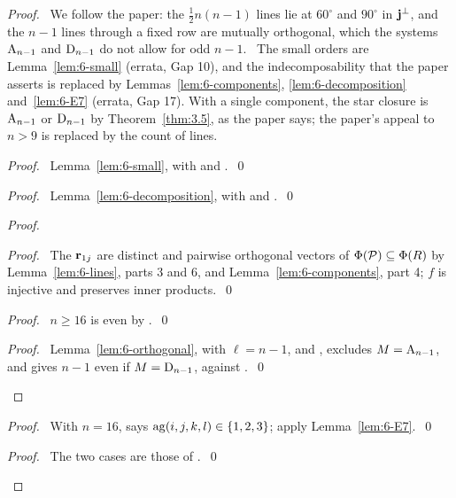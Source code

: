\begin{proof}
 \pfsketch\ We follow the paper: the $\frac12n(n-1)$ lines lie at $60^\circ$ and $90^\circ$ in
 ${\mathbf j}^\perp$, and the $n-1$ lines through a fixed row are mutually orthogonal, which the systems
 $\mathrm{A}_{n-1}$ and $\mathrm{D}_{n-1}$ do not allow for odd $n-1$. \repair\ The small orders are
 Lemma~\ref{lem:6-small} (errata, Gap 10), and the indecomposability that the paper asserts is
 replaced by Lemmas~\ref{lem:6-components}, \ref{lem:6-decomposition} and~\ref{lem:6-E7}
 (errata, Gap 17). With a single component, the star closure is $\mathrm{A}_{n-1}$ or
 $\mathrm{D}_{n-1}$ by Theorem~\ref{thm:3.5}, as the paper says; the paper's appeal to $n>9$ is
 replaced by the count of lines.
 \begin{proof}\pf\ Lemma~\ref{lem:6-small}, with  and .~\qed\end{proof}
 \begin{proof}\pf\ Lemma~\ref{lem:6-decomposition}, with  and
  .~\qed\end{proof}
 \begin{proof}
  \begin{proof}\pf\ The ${\mathbf r}_{1j}$ are distinct and pairwise orthogonal vectors of
   $\Phi({\mathcal P})\subseteq\Phi(R)$ by Lemma~\ref{lem:6-lines}, parts 3 and 6, and
   Lemma~\ref{lem:6-components}, part 4; $f$ is injective and preserves inner products.~\qed
  \end{proof}
  \begin{proof}\pf\ $n\geq16$ is even by .~\qed\end{proof}
  \qedstep
  \begin{proof}\pf\ Lemma~\ref{lem:6-orthogonal}, with $\ell=n-1$,  and
   , excludes $M=\mathrm{A}_{n-1}$, and gives $n-1$ even if $M=\mathrm{D}_{n-1}$,
   against .~\qed\end{proof}
 \end{proof}
 \begin{proof}\pf\ With $n=16$,  says $\mathop{\mathrm{ag}}\nolimits(i,j,k,l)\in\{1,2,3\}$; apply
  Lemma~\ref{lem:6-E7}.~\qed\end{proof}
 \qedstep
 \begin{proof}\pf\ The two cases are those of .~\qed\end{proof}
\end{proof}

